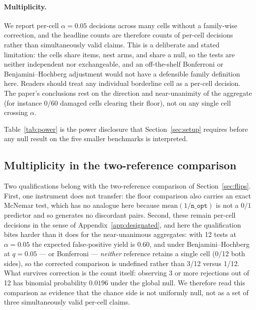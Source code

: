 \paragraph{Multiplicity.} We report per-cell $\alpha=0.05$ decisions across many cells without a family-wise correction, and the headline counts are therefore counts of per-cell decisions rather than simultaneously valid claims. This is a deliberate and stated limitation: the cells share items, nest arms, and share a null, so the tests are neither independent nor exchangeable, and an off-the-shelf Bonferroni or Benjamini--Hochberg adjustment would not have a defensible family definition here. Readers should treat any individual borderline cell as a per-cell decision. The paper's conclusions rest on the direction and near-unanimity of the aggregate (for instance 0/60 damaged cells clearing their floor), not on any single cell crossing $\alpha$.

Table~\ref{tab:power} is the power disclosure that Section~\ref{sec:setup} requires before any null result on the five smaller benchmarks is interpreted.



\FloatBarrier

\subsection{Multiplicity in the two-reference comparison}
\label{app:analysis-mult}

Two qualifications belong with the two-reference comparison of Section~\ref{sec:flips}. First, one instrument does not transfer: the floor comparison also carries an exact McNemar test, which has no analogue here because $\mathrm{mean}(1/\texttt{n\_opt})$ is not a $0/1$ predictor and so generates no discordant pairs. Second, these remain per-cell decisions in the sense of Appendix~\ref{app:designated}, and here the qualification bites harder than it does for the near-unanimous aggregates: with 12 tests at $\alpha=0.05$ the expected false-positive yield is $0.60$, and under Benjamini--Hochberg at $q=0.05$ --- or Bonferroni --- \emph{neither} reference retains a single cell (0/12 both sides), so the corrected comparison is undefined rather than 3/12 versus 1/12. What survives correction is the count itself: observing 3 or more rejections out of 12 has binomial probability $0.0196$ under the global null. We therefore read this comparison as evidence that the chance side is not uniformly null, not as a set of three simultaneously valid per-cell claims.

